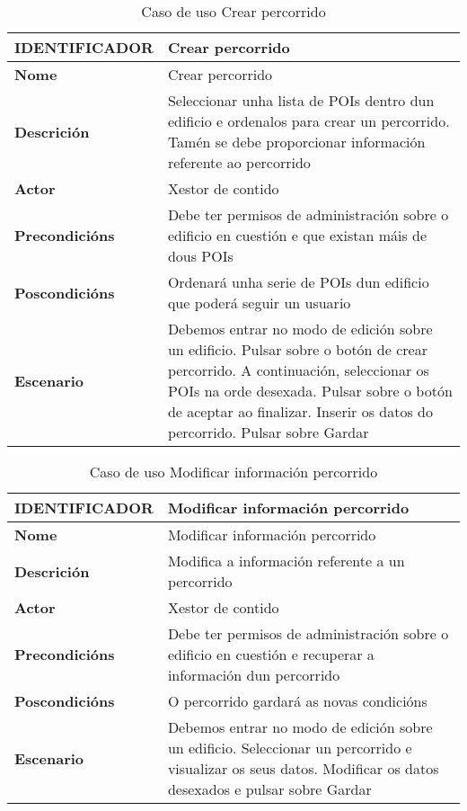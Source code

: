 \begin{table}[tbp]
	\begin{tabular}{|l|p{10cm}|}
		\hline 
		\textbf{IDENTIFICADOR}	& \textbf{Crear percorrido} \\ 
		\hline 
		\textbf{Nome} & Crear percorrido \\ 
		\hline 
		\textbf{Descrición} & Seleccionar unha lista de POIs dentro dun edificio e ordenalos para crear un percorrido. Tamén se debe proporcionar información referente ao percorrido \\ 
		\hline 
		\textbf{Actor} & Xestor de contido \\ 
		\hline 
		\textbf{Precondicións} & Debe ter permisos de administración sobre o edificio en cuestión e que existan máis de dous POIs \\ 
		\hline 
		\textbf{Poscondicións} & Ordenará unha serie de POIs dun edificio que poderá seguir un usuario \\ 
		\hline 
		\textbf{Escenario} & Debemos entrar no modo de edición sobre un edificio. Pulsar sobre o botón de crear percorrido. A continuación, seleccionar os POIs na orde desexada. Pulsar sobre o botón de aceptar ao finalizar. Inserir os datos do percorrido. Pulsar sobre Gardar \\ 
		\hline 
	\end{tabular}
	\caption{Caso de uso Crear percorrido}
	\label{tab:cuCrearPercorrido}
\end{table}

\begin{table}[tbp]
	\begin{tabular}{|l|p{10cm}|}
		\hline 
		\textbf{IDENTIFICADOR}	& \textbf{Modificar información percorrido} \\ 
		\hline 
		\textbf{Nome} & Modificar información percorrido \\ 
		\hline 
		\textbf{Descrición} & Modifica a información referente a un percorrido \\ 
		\hline 
		\textbf{Actor} & Xestor de contido \\ 
		\hline 
		\textbf{Precondicións} & Debe ter permisos de administración sobre o edificio en cuestión e recuperar a información dun percorrido \\ 
		\hline 
		\textbf{Poscondicións} & O percorrido gardará as novas condicións \\ 
		\hline 
		\textbf{Escenario} & Debemos entrar no modo de edición sobre un edificio. Seleccionar un percorrido e visualizar os seus datos. Modificar os datos desexados e pulsar sobre Gardar \\ 
		\hline 
	\end{tabular}
	\caption{Caso de uso Modificar información percorrido}
	\label{tab:cuModificarPercorrido}
\end{table}

